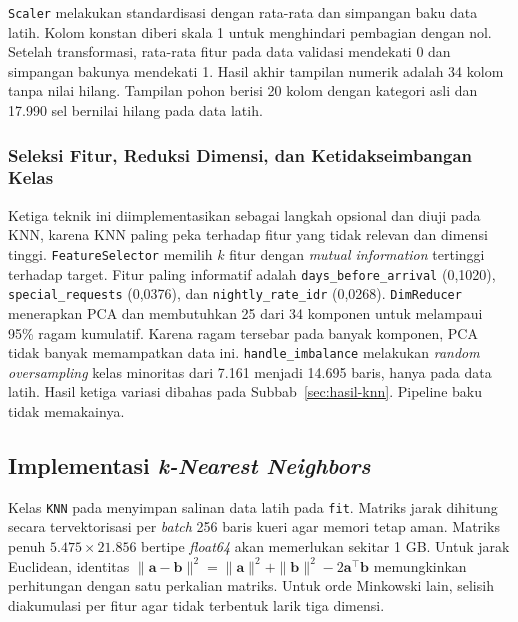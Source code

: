 \texttt{Scaler} melakukan standardisasi dengan rata-rata dan simpangan baku data latih. Kolom konstan diberi skala 1 untuk menghindari pembagian dengan nol. Setelah transformasi, rata-rata fitur pada data validasi mendekati 0 dan simpangan bakunya mendekati 1. Hasil akhir tampilan numerik adalah 34 kolom tanpa nilai hilang. Tampilan pohon berisi 20 kolom dengan kategori asli dan 17.990 sel bernilai hilang pada data latih.

\subsubsection{Seleksi Fitur, Reduksi Dimensi, dan Ketidakseimbangan Kelas}
Ketiga teknik ini diimplementasikan sebagai langkah opsional dan diuji pada KNN, karena KNN paling peka terhadap fitur yang tidak relevan dan dimensi tinggi. \texttt{FeatureSelector} memilih $k$ fitur dengan \textit{mutual information} tertinggi terhadap target. Fitur paling informatif adalah \texttt{days\_before\_arrival} (0,1020), \texttt{special\_requests} (0,0376), dan \texttt{nightly\_rate\_idr} (0,0268). \texttt{DimReducer} menerapkan PCA dan membutuhkan 25 dari 34 komponen untuk melampaui 95\% ragam kumulatif. Karena ragam tersebar pada banyak komponen, PCA tidak banyak memampatkan data ini. \texttt{handle\_imbalance} melakukan \textit{random oversampling} kelas minoritas dari 7.161 menjadi 14.695 baris, hanya pada data latih. Hasil ketiga variasi dibahas pada Subbab~\ref{sec:hasil-knn}. Pipeline baku tidak memakainya.

\subsection{Implementasi \textit{k-Nearest Neighbors}}
Kelas \texttt{KNN} pada  menyimpan salinan data latih pada \texttt{fit}. Matriks jarak dihitung secara tervektorisasi per \textit{batch} 256 baris kueri agar memori tetap aman. Matriks penuh $5.475\times21.856$ bertipe \textit{float64} akan memerlukan sekitar 1 GB. Untuk jarak Euclidean, identitas $\|\mathbf{a}-\mathbf{b}\|^2=\|\mathbf{a}\|^2+\|\mathbf{b}\|^2-2\mathbf{a}^\top\mathbf{b}$ memungkinkan perhitungan dengan satu perkalian matriks. Untuk orde Minkowski lain, selisih diakumulasi per fitur agar tidak terbentuk larik tiga dimensi.

